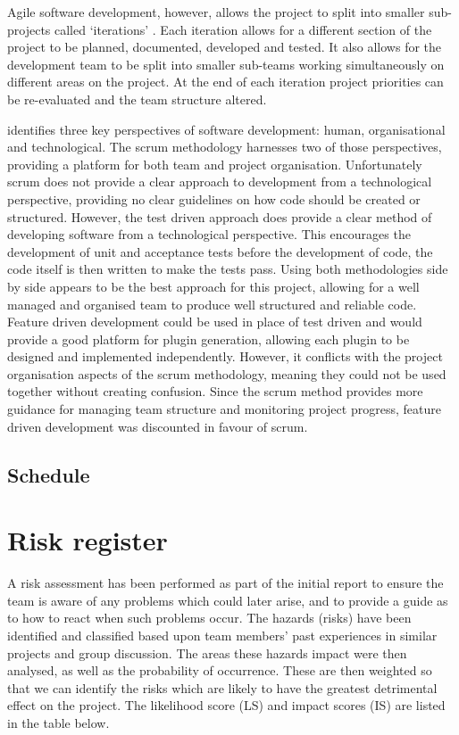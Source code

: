 \documentclass[10pt,a4paper]{article}
\begin{document}
Agile software development, however, allows the project to split into smaller
sub-projects called `iterations' \cite{hazzan2008agile}. Each iteration allows
for a different section of the project to be planned, documented, developed and
tested. It also allows for the development team to be split into smaller
sub-teams working simultaneously on different areas on the project. At the end
of each iteration project priorities can be re-evaluated and the team structure
altered. 

\cite{hazzan2008agile} identifies three key perspectives of software
development: human, organisational and technological. The scrum methodology
harnesses two of those perspectives, providing a platform for both team and
project organisation. Unfortunately scrum does not provide a clear approach to
development from a technological perspective, providing no clear guidelines on
how code should be created or structured. However, the test driven approach does
provide a clear method of developing software from a technological perspective.
This encourages the development of unit and acceptance tests before the
development of code, the code itself is then written to make the tests pass.
Using both methodologies side by side appears to be the best approach for this
project, allowing for a well managed and organised team to produce well
structured and reliable code. Feature driven development could be used in place
of test driven and would provide a good platform for plugin generation, allowing
each plugin to be designed and implemented independently. However, it conflicts
with the project organisation aspects of the scrum methodology, meaning they
could not be used together without creating confusion. Since the scrum method
provides more guidance for managing team structure and monitoring project
progress, feature driven development was discounted in favour of scrum.

\subsection{Schedule}




\section{Risk register}

A risk assessment has been performed as part of the initial report to ensure the
team is aware of any problems which could later arise, and to provide a guide as
to how to react when such problems occur. The hazards (risks) have been
identified and classified based upon team members' past experiences in similar
projects and group discussion. The areas these hazards impact were then
analysed, as well as the probability of occurrence. These are then weighted so
that we can identify the risks which are likely to have the greatest detrimental
effect on the project. The likelihood score (LS) and impact scores (IS) are
listed in the table below.
\end{document}
